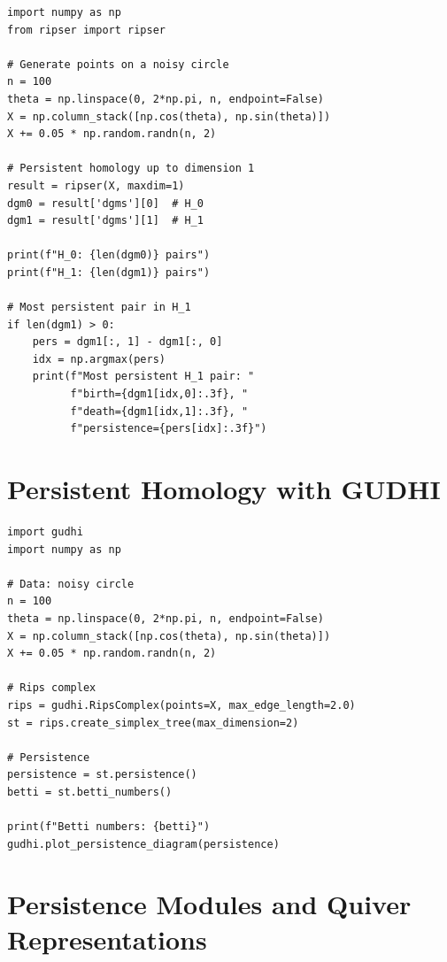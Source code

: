 \begin{codeblock}[title=\textbf{Computation with Ripser}]
\begin{verbatim}
import numpy as np
from ripser import ripser

# Generate points on a noisy circle
n = 100
theta = np.linspace(0, 2*np.pi, n, endpoint=False)
X = np.column_stack([np.cos(theta), np.sin(theta)])
X += 0.05 * np.random.randn(n, 2)

# Persistent homology up to dimension 1
result = ripser(X, maxdim=1)
dgm0 = result['dgms'][0]  # H_0
dgm1 = result['dgms'][1]  # H_1

print(f"H_0: {len(dgm0)} pairs")
print(f"H_1: {len(dgm1)} pairs")

# Most persistent pair in H_1
if len(dgm1) > 0:
    pers = dgm1[:, 1] - dgm1[:, 0]
    idx = np.argmax(pers)
    print(f"Most persistent H_1 pair: "
          f"birth={dgm1[idx,0]:.3f}, "
          f"death={dgm1[idx,1]:.3f}, "
          f"persistence={pers[idx]:.3f}")
\end{verbatim}
\end{codeblock}

\section{Persistent Homology with GUDHI}

\begin{codeblock}[title=\textbf{Computation with GUDHI}]
\begin{verbatim}
import gudhi
import numpy as np

# Data: noisy circle
n = 100
theta = np.linspace(0, 2*np.pi, n, endpoint=False)
X = np.column_stack([np.cos(theta), np.sin(theta)])
X += 0.05 * np.random.randn(n, 2)

# Rips complex
rips = gudhi.RipsComplex(points=X, max_edge_length=2.0)
st = rips.create_simplex_tree(max_dimension=2)

# Persistence
persistence = st.persistence()
betti = st.betti_numbers()

print(f"Betti numbers: {betti}")
gudhi.plot_persistence_diagram(persistence)
\end{verbatim}
\end{codeblock}

\section{Persistence Modules and Quiver Representations}

